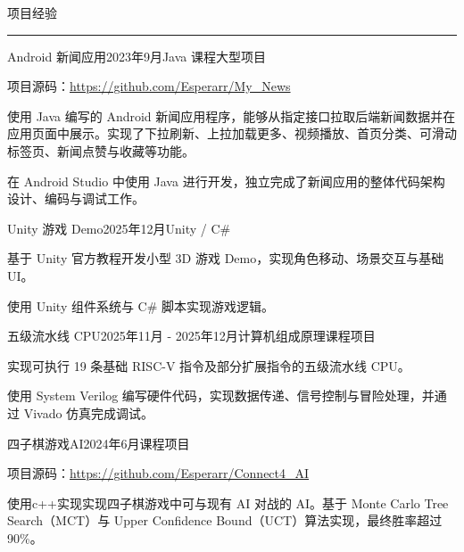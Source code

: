 \documentclass{resume} %
\renewenvironment{rSection}[1]{
\sectionskip
\textcolor{TsinghuaPurple}{\MakeUppercase{#1}}
\sectionlineskip
\hrule
\begin{list}{}{
\setlength{\leftmargin}{0em}
}
\item[]
}{
\end{list}
}
\begin{document}
\begin{rSection}{项目经验}
\begin{rSubsection}{Android 新闻应用}{2023年9月}{Java 课程大型项目}{}
\item 项目源码：\url{https://github.com/Esperarr/My_News}
\item 使用 Java 编写的 Android 新闻应用程序，能够从指定接口拉取后端新闻数据并在应用页面中展示。实现了下拉刷新、上拉加载更多、视频播放、首页分类、可滑动标签页、新闻点赞与收藏等功能。
\item 在 Android Studio 中使用 Java 进行开发，独立完成了新闻应用的整体代码架构设计、编码与调试工作。
\end{rSubsection}

\begin{rSubsection}{Unity 游戏 Demo}{2025年12月}{Unity / C\#}{}
\item 基于 Unity 官方教程开发小型 3D 游戏 Demo，实现角色移动、场景交互与基础 UI。
\item 使用 Unity 组件系统与 C\# 脚本实现游戏逻辑。
\end{rSubsection}

\begin{rSubsection}{五级流水线 CPU}{2025年11月 - 2025年12月}{计算机组成原理课程项目}{}
\item 实现可执行 19 条基础 RISC-V 指令及部分扩展指令的五级流水线 CPU。
\item 使用 System Verilog 编写硬件代码，实现数据传递、信号控制与冒险处理，并通过 Vivado 仿真完成调试。
\end{rSubsection}

\begin{rSubsection}{四子棋游戏AI}{2024年6月}{课程项目}{}
\item 项目源码：\url{https://github.com/Esperarr/Connect4_AI}
\item 使用c++实现实现四子棋游戏中可与现有 AI 对战的 AI。基于 Monte Carlo Tree Search（MCT）与 Upper Confidence Bound（UCT）算法实现，最终胜率超过 90\%。
\end{rSubsection}

\end{rSection}
\end{document}
